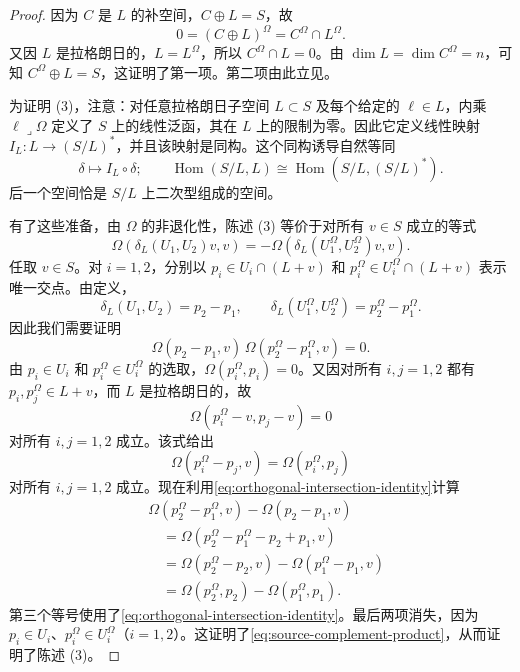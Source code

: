 \begin{proof}
因为 $C$ 是 $L$ 的补空间，$C\oplus L=S$，故
\[
 0=(C\oplus L)^\Omega=C^\Omega\cap L^\Omega.
\]
又因 $L$ 是拉格朗日的，$L=L^\Omega$，所以 $C^\Omega\cap L=0$。由
$\dim L=\dim C^\Omega=n$，可知 $C^\Omega\oplus L=S$，这证明了第一项。第二项由此立见。

为证明 (3)，注意：对任意拉格朗日子空间 $L\subset S$ 及每个给定的
$\ell\in L$，内乘 $\ell\mathbin{\lrcorner}\Omega$ 定义了 $S$ 上的线性泛函，其在 $L$ 上的限制为零。因此它定义线性映射
$I_L:L\to(S/L)^*$，并且该映射是同构。这个同构诱导自然等同
\[
 \delta\longmapsto I_L\circ\delta;\qquad
 \operatorname{Hom}(S/L,L)\cong\operatorname{Hom}(S/L,(S/L)^*).
\]
后一个空间恰是 $S/L$ 上二次型组成的空间。

有了这些准备，由 $\Omega$ 的非退化性，陈述 (3) 等价于对所有 $v\in S$ 成立的等式
\begin{equation}
 \Omega(\delta_L(U_1,U_2)v,v)
 =-\Omega(\delta_L(U_1^\Omega,U_2^\Omega)v,v).
 \label{eq:complement-quadratic-sign}
\end{equation}
任取 $v\in S$。对 $i=1,2$，分别以
$p_i\in U_i\cap(L+v)$ 和 $p_i^\Omega\in U_i^\Omega\cap(L+v)$ 表示唯一交点。由定义，
\[
 \delta_L(U_1,U_2)=p_2-p_1,
 \qquad
 \delta_L(U_1^\Omega,U_2^\Omega)=p_2^\Omega-p_1^\Omega.
\]
因此我们需要证明
\begin{equation}
 \Omega(p_2-p_1,v)\,\Omega(p_2^\Omega-p_1^\Omega,v)=0.
 \label{eq:source-complement-product}
\end{equation}
由 $p_i\in U_i$ 和 $p_i^\Omega\in U_i^\Omega$ 的选取，$\Omega(p_i^\Omega,p_i)=0$。又因对所有 $i,j=1,2$ 都有 $p_i,p_j^\Omega\in L+v$，而 $L$ 是拉格朗日的，故
\begin{equation}
 \Omega(p_i^\Omega-v,p_j-v)=0
 \label{eq:lagrangian-affine-coset}
\end{equation}
对所有 $i,j=1,2$ 成立。该式给出
\begin{equation}
 \Omega(p_i^\Omega-p_j,v)=\Omega(p_i^\Omega,p_j)
 \label{eq:orthogonal-intersection-identity}
\end{equation}
对所有 $i,j=1,2$ 成立。现在利用\eqref{eq:orthogonal-intersection-identity}计算
\[
\begin{aligned}
 &\Omega(p_2^\Omega-p_1^\Omega,v)-\Omega(p_2-p_1,v)\\
 &\quad=\Omega(p_2^\Omega-p_1^\Omega-p_2+p_1,v)\\
 &\quad=\Omega(p_2^\Omega-p_2,v)-\Omega(p_1^\Omega-p_1,v)\\
 &\quad=\Omega(p_2^\Omega,p_2)-\Omega(p_1^\Omega,p_1).
\end{aligned}
\]
第三个等号使用了\eqref{eq:orthogonal-intersection-identity}。最后两项消失，因为
$p_i\in U_i$、$p_i^\Omega\in U_i^\Omega$（$i=1,2$）。这证明了\eqref{eq:source-complement-product}，从而证明了陈述 (3)。


\end{proof}

